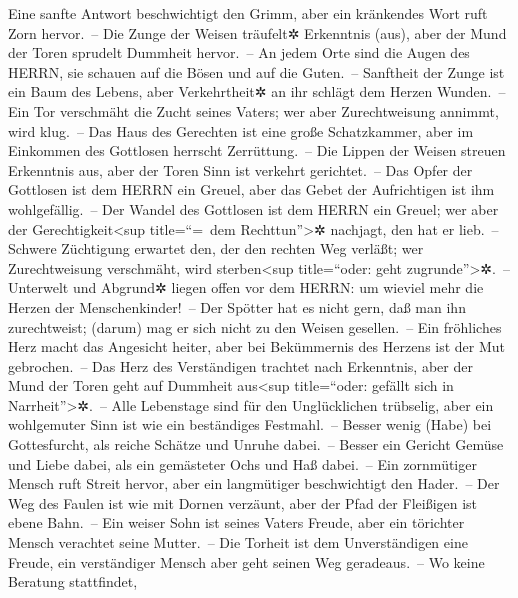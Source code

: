 Eine sanfte Antwort beschwichtigt den Grimm, aber ein
kränkendes Wort ruft Zorn hervor.~-- Die Zunge der Weisen
träufelt✲ Erkenntnis (aus), aber der Mund der Toren sprudelt Dummheit
hervor.~-- An jedem Orte sind die Augen des HERRN, sie
schauen auf die Bösen und auf die Guten.~-- Sanftheit der
Zunge ist ein Baum des Lebens, aber Verkehrtheit✲ an ihr schlägt dem
Herzen Wunden.~-- Ein Tor verschmäht die Zucht seines
Vaters; wer aber Zurechtweisung annimmt, wird klug.~-- Das
Haus des Gerechten ist eine große Schatzkammer, aber im Einkommen des
Gottlosen herrscht Zerrüttung.~-- Die Lippen der Weisen
streuen Erkenntnis aus, aber der Toren Sinn ist verkehrt gerichtet.~--
Das Opfer der Gottlosen ist dem HERRN ein Greuel, aber das
Gebet der Aufrichtigen ist ihm wohlgefällig.~-- Der Wandel
des Gottlosen ist dem HERRN ein Greuel; wer aber der
Gerechtigkeit\textless sup title=``=~dem Rechttun''\textgreater✲
nachjagt, den hat er lieb.~-- Schwere Züchtigung erwartet
den, der den rechten Weg verläßt; wer Zurechtweisung verschmäht, wird
sterben\textless sup title=``oder: geht zugrunde''\textgreater✲.~--
Unterwelt und Abgrund✲ liegen offen vor dem HERRN: um
wieviel mehr die Herzen der Menschenkinder!~-- Der
Spötter hat es nicht gern, daß man ihn zurechtweist; (darum) mag er sich
nicht zu den Weisen gesellen.~-- Ein fröhliches Herz
macht das Angesicht heiter, aber bei Bekümmernis des Herzens ist der Mut
gebrochen.~-- Das Herz des Verständigen trachtet nach
Erkenntnis, aber der Mund der Toren geht auf Dummheit aus\textless sup
title=``oder: gefällt sich in Narrheit''\textgreater✲.~--
Alle Lebenstage sind für den Unglücklichen trübselig,
aber ein wohlgemuter Sinn ist wie ein beständiges Festmahl.~--
Besser wenig (Habe) bei Gottesfurcht, als reiche Schätze
und Unruhe dabei.~-- Besser ein Gericht Gemüse und Liebe
dabei, als ein gemästeter Ochs und Haß dabei.~-- Ein
zornmütiger Mensch ruft Streit hervor, aber ein langmütiger
beschwichtigt den Hader.~-- Der Weg des Faulen ist wie
mit Dornen verzäunt, aber der Pfad der Fleißigen ist ebene Bahn.~--
Ein weiser Sohn ist seines Vaters Freude, aber ein
törichter Mensch verachtet seine Mutter.~-- Die Torheit
ist dem Unverständigen eine Freude, ein verständiger Mensch aber geht
seinen Weg geradeaus.~-- Wo keine Beratung stattfindet,
